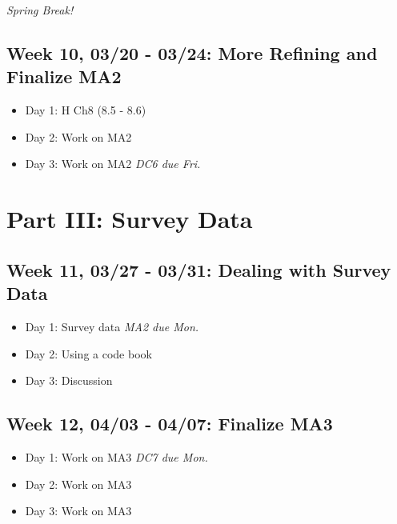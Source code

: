 \documentclass[11pt,]{article}
\begin{document}
\emph{Spring Break!}

\hypertarget{week-10-0320---0324-more-refining-and-finalize-ma2}{%
\subsection{Week 10, 03/20 - 03/24: More Refining and Finalize
MA2}\label{week-10-0320---0324-more-refining-and-finalize-ma2}}

\begin{itemize}
\item
  Day 1: H Ch8 (8.5 - 8.6)
\item
  Day 2: Work on MA2
\item
  Day 3: Work on MA2 \hfill \textit{DC6 due Fri.}
\end{itemize}

\hypertarget{part-iii-survey-data}{%
\section{Part III: Survey Data}\label{part-iii-survey-data}}

\hypertarget{week-11-0327---0331-dealing-with-survey-data}{%
\subsection{Week 11, 03/27 - 03/31: Dealing with Survey
Data}\label{week-11-0327---0331-dealing-with-survey-data}}

\begin{itemize}
\item
  Day 1: Survey data \hfill \textit{MA2 due Mon.}
\item
  Day 2: Using a code book
\item
  Day 3: Discussion
\end{itemize}

\hypertarget{week-12-0403---0407-finalize-ma3}{%
\subsection{Week 12, 04/03 - 04/07: Finalize
MA3}\label{week-12-0403---0407-finalize-ma3}}

\begin{itemize}
\item
  Day 1: Work on MA3 \hfill \textit{DC7 due Mon.}
\item
  Day 2: Work on MA3
\item
  Day 3: Work on MA3
\end{itemize}
\end{document}
